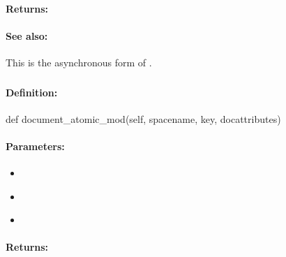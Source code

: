 \paragraph{Returns:}


\paragraph{See also:}  This is the asynchronous form of .

\pagebreak
\subsubsection{}
\label{api:python:document_atomic_mod}


\paragraph{Definition:}
\begin{pythoncode}
def document_atomic_mod(self, spacename, key, docattributes)
\end{pythoncode}

\paragraph{Parameters:}
\begin{itemize}[noitemsep]
\item {}\\

\item {}\\

\item {}\\

\end{itemize}

\paragraph{Returns:}


\pagebreak
\subsubsection{}
\label{api:python:async_document_atomic_mod}



